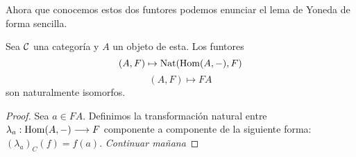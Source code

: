 Ahora que conocemos estos dos funtores podemos enunciar el lema
de Yoneda de forma sencilla.

\begin{theorem}
  Sea $\mathcal{C}$ una categoría y $A$ un objeto de esta. Los funtores
  $$(A, F) \mapsto \operatorname{Nat}(\operatorname{Hom}(A, -), F)$$
  $$(A, F) \mapsto FA$$
  son naturalmente isomorfos.
\end{theorem}
\begin{proof}
  Sea $a \in F A$. Definimos la transformación natural entre
  $\lambda_a : \operatorname{Hom}(A, -)\longrightarrow F$ componente a componente de
  la siguiente forma: $(\lambda_a)_C(f) = f(a)$.
  \textit{Continuar mañana}
\end{proof}
